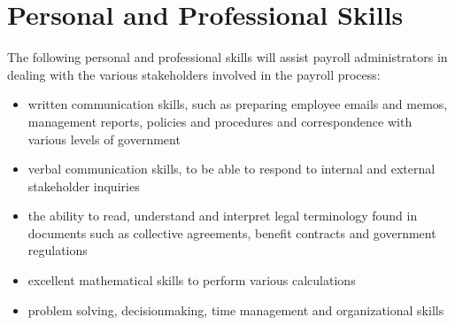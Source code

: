 \documentclass[letterpaper,10pt,english]{sphinxmanual}
\begin{document}
\section{Personal and Professional Skills}
\label{\detokenize{1_introduction:personal-and-professional-skills}}
\sphinxAtStartPar
The following personal and professional skills will assist payroll
administrators in dealing with the various stakeholders involved in the
payroll process:
\begin{itemize}
\item {} 
\sphinxAtStartPar
written communication skills, such as preparing employee emails and memos, management reports, policies and procedures and correspondence with various levels of government

\item {} 
\sphinxAtStartPar
verbal communication skills, to be able to respond to internal and external stakeholder inquiries

\item {} 
\sphinxAtStartPar
the ability to read, understand and interpret legal terminology found in documents such as collective agreements, benefit contracts and government regulations

\item {} 
\sphinxAtStartPar
excellent mathematical skills to perform various calculations

\item {} 
\sphinxAtStartPar
problem solving, decision\sphinxhyphen{}making, time management and organizational skills

\end{itemize}
\end{document}
